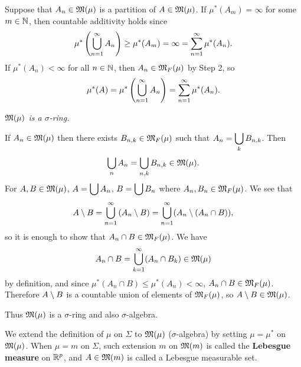 Suppose that \(A_n \in \mathfrak{M}(\mu)\) is a partition of \(A \in \mathfrak{M}(\mu)\). If \(\mu^\ast(A_m) = \infty\) for some \(m \in \mathbb{N}\), then countable additivity holds since
\[
    \mu^\ast\left( \bigcup_{n=1}^\infty A_n \right) \geq \mu^\ast(A_m) = \infty = \sum_{n=1}^\infty \mu^\ast(A_n).
\]
If \(\mu^\ast(A_n) < \infty\) for all \(n\in \mathbb{N}\), then \(A_n \in \mathfrak{M}_F(\mu)\) by {\sffamily Step 2}, so
\[
    \mu^\ast(A) = \mu^\ast\left( \bigcup_{n=1}^\infty A_n \right) = \sum_{n=1}^\infty \mu^\ast(A_n).
\]

 \textit{\(\mathfrak{M}(\mu)\) is a \(\sigma\)-ring.}

If \(A_n \in \mathfrak{M}(\mu)\) then there exists \(B_{n, k} \in \mathfrak{M}_F(\mu)\) such that \(\displaystyle A_n = \bigcup_k B_{n,k}\). Then
\[
    \bigcup_n A_n = \bigcup_{n, k} B_{n, k} \in \mathfrak{M}(\mu).
\]
For \(A, B \in \mathfrak{M}(\mu)\), \(\displaystyle A = \bigcup A_n\), \(\displaystyle B = \bigcup B_n\) where \(A_n, B_n \in \mathfrak{M}_F(\mu)\). We see that
\[
    A \setminus B = \bigcup_{n=1}^\infty \left( A_n \setminus B \right) = \bigcup_{n=1}^\infty (A_n\setminus(A_n\cap B)),
\]
so it is enough to show that \(A_n \cap B \in \mathfrak{M}_F(\mu)\). We have
\[
    A_n \cap B = \bigcup_{k=1}^\infty (A_n \cap B_k) \in \mathfrak{M}(\mu)
\]
by definition, and since \(\mu^\ast(A_n \cap B) \leq \mu^\ast(A_n) < \infty\), \(A_n\cap B \in \mathfrak{M}_F(\mu)\). Therefore \(A \setminus B\) is a countable union of elements of \(\mathfrak{M}_F(\mu)\), so \(A\setminus B \in \mathfrak{M}(\mu)\).

Thus \(\mathfrak{M}(\mu)\) is a \(\sigma\)-ring and also \(\sigma\)-algebra.

\bigskip

We extend the definition of \(\mu\) on \(\Sigma\) to \(\mathfrak{M}(\mu)\) (\(\sigma\)-algebra) by setting \(\mu = \mu^\ast\) on \(\mathfrak{M}(\mu)\). When \(\mu = m\) on \(\Sigma\), such extension \(m\) on \(\mathfrak{M}(m)\) is called the \textbf{Lebesgue measure} on \(\mathbb{R}^p\), and \(A \in \mathfrak{M}(m)\) is called a Lebesgue measurable set.

\pagebreak
